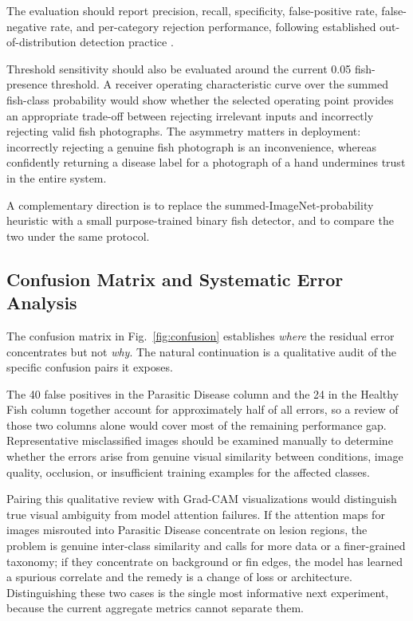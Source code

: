 \documentclass[conference]{IEEEtran}
\begin{document}
The evaluation should report precision, recall, specificity, false-positive rate, false-negative rate, and per-category rejection performance, following established out-of-distribution detection practice \cite{b25}.

Threshold sensitivity should also be evaluated around the current 0.05 fish-presence threshold. A receiver operating characteristic curve over the summed fish-class probability would show whether the selected operating point provides an appropriate trade-off between rejecting irrelevant inputs and incorrectly rejecting valid fish photographs. The asymmetry matters in deployment: incorrectly rejecting a genuine fish photograph is an inconvenience, whereas confidently returning a disease label for a photograph of a hand undermines trust in the entire system.

A complementary direction is to replace the summed-ImageNet-probability heuristic with a small purpose-trained binary fish detector, and to compare the two under the same protocol.

\subsection{Confusion Matrix and Systematic Error Analysis}

The confusion matrix in Fig.~\ref{fig:confusion} establishes \emph{where} the residual error concentrates but not \emph{why}. The natural continuation is a qualitative audit of the specific confusion pairs it exposes.

The 40 false positives in the Parasitic Disease column and the 24 in the Healthy Fish column together account for approximately half of all errors, so a review of those two columns alone would cover most of the remaining performance gap. Representative misclassified images should be examined manually to determine whether the errors arise from genuine visual similarity between conditions, image quality, occlusion, or insufficient training examples for the affected classes.

Pairing this qualitative review with Grad-CAM visualizations \cite{b30} would distinguish true visual ambiguity from model attention failures. If the attention maps for images misrouted into Parasitic Disease concentrate on lesion regions, the problem is genuine inter-class similarity and calls for more data or a finer-grained taxonomy; if they concentrate on background or fin edges, the model has learned a spurious correlate and the remedy is a change of loss or architecture. Distinguishing these two cases is the single most informative next experiment, because the current aggregate metrics cannot separate them.
\end{document}
